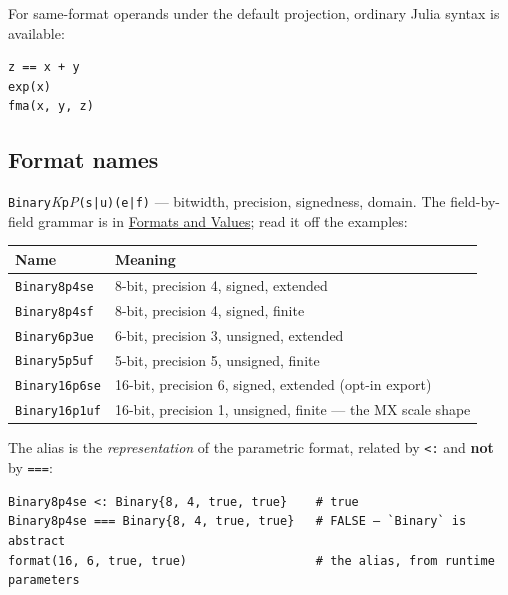 For same-format operands under the default projection, ordinary Julia syntax is available:




\nopagebreak[4]
\begin{verbatim}
z == x + y
exp(x)
fma(x, y, z)
\end{verbatim}



\subsection{Format names}



\label{4610047011167023553}{}


\texttt{Binary}\emph{K}\texttt{p}\emph{P}\texttt{(s|u)(e|f)} — bitwidth, precision, signedness, domain. The field-by-field grammar is in \href{reference\_\allowbreak{}formats\_\allowbreak{}values.md}{Formats and Values}; read it off the examples:




\begin{table}[h]
\centering
\begin{tabulary}{\linewidth}{L L}
\toprule
Name & Meaning \\
\toprule
\texttt{Binary8p4se} & 8-bit, precision 4, signed, extended \\
\texttt{Binary8p4sf} & 8-bit, precision 4, signed, finite \\
\texttt{Binary6p3ue} & 6-bit, precision 3, unsigned, extended \\
\texttt{Binary5p5uf} & 5-bit, precision 5, unsigned, finite \\
\texttt{Binary16p6se} & 16-bit, precision 6, signed, extended (opt-in export) \\
\texttt{Binary16p1uf} & 16-bit, precision 1, unsigned, finite — the MX scale shape \\
\bottomrule
\end{tabulary}

\end{table}



The alias is the \emph{representation} of the parametric format, related by \texttt{<:} and \textbf{not} by \texttt{===}:




\nopagebreak[4]
\begin{verbatim}
Binary8p4se <: Binary{8, 4, true, true}    # true
Binary8p4se === Binary{8, 4, true, true}   # FALSE — `Binary` is abstract
format(16, 6, true, true)                  # the alias, from runtime parameters
\end{verbatim}



